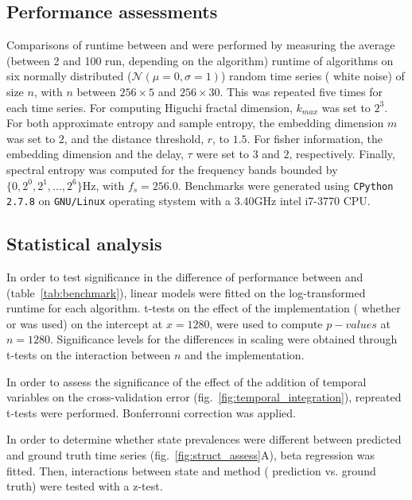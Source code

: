 \subsection{Performance assessments}
Comparisons of runtime between \pr{} and \pyeeg{}\cite{bao_pyeeg:_2011} were performed by
measuring the average (between 2 and 100 run, depending on the algorithm) runtime of algorithms on six normally distributed ($\mathcal{N}(\mu=0,\sigma=1)$) random time series (\ie{} white noise) of size $n$,
with $n$ between $256 \times{} 5$ and $256 \times{} 30$.
This was repeated five times for each time series.
For computing  Higuchi fractal dimension\cite{higuchi_approach_1988}, $k_{max}$
was set to $2^3$.
For both approximate entropy and sample
entropy\cite{richman_physiological_2000}, the embedding dimension $m$ was set to $2$, and the distance threshold, $r$, to $1.5$.
For fisher information, the embedding dimension and the delay, $\tau$ were set to $3$ and $2$, respectively.
Finally, spectral entropy was computed for the frequency bands bounded by $\{0, 2^0, 2^1, ..., 2^6\}$Hz, with $f_s = 256.0$.
Benchmarks were generated using \texttt{CPython 2.7.8} on \texttt{GNU/Linux} operating stystem with a 3.40GHz intel i7-3770 CPU.

\subsection{Statistical analysis}
In order to test significance in the difference of performance between \pr{} and \pyeeg{} (table~\ref{tab:benchmark}),
linear models were fitted on the log-transformed runtime for each algorithm. 
t-tests on the effect of the implementation (\ie{} whether \pr{} or \pyeeg{} was used) on the intercept at $x=1280$, were used to compute $p-values$ at $n=1280$.
Significance levels for the differences in scaling were obtained through t-tests on the interaction between $n$ and the implementation.


In order to assess the significance of the effect of the addition of temporal variables on the cross-validation
error (fig.~\ref{fig:temporal_integration}), repreated t-tests were performed.
Bonferronni correction was applied.

In order to determine whether state prevalences were different between predicted and ground truth time series (fig.~\ref{fig:struct_assess}A),
beta regression \cite{cribari-neto_beta_2009} was fitted. 
Then, interactions between state and method (\ie{} prediction vs. ground truth) were tested with a z-test.

